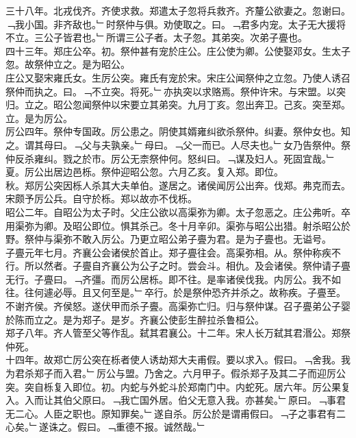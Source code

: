 \documentclass{zhvt-classic}
\begin{document}
\hspace*{2em}三十八年。北戎伐齐。齐使求救。郑遣太子忽将兵救齐。齐釐公欲妻之。忽谢曰。﹁我小国。非齐敌也。﹂时祭仲与俱。劝使取之。曰。﹁君多内宠。太子无大援将不立。三公子皆君也。﹂所谓三公子者。太子忽。其弟突。次弟子亹也。\\
\hspace*{2em}四十三年。郑庄公卒。初。祭仲甚有宠於庄公。庄公使为卿。公使娶邓女。生太子忽。故祭仲立之。是为昭公。\\
\hspace*{2em}庄公又娶宋雍氏女。生厉公突。雍氏有宠於宋。宋庄公闻祭仲之立忽。乃使人诱召祭仲而执之。曰。﹁不立突。将死。﹂亦执突以求赂焉。祭仲许宋。与宋盟。以突归。立之。昭公忽闻祭仲以宋要立其弟突。九月丁亥。忽出奔卫。己亥。突至郑。立。是为厉公。\\
\hspace*{2em}厉公四年。祭仲专国政。厉公患之。阴使其婿雍纠欲杀祭仲。纠妻。祭仲女也。知之。谓其母曰。﹁父与夫孰亲。﹂母曰。﹁父一而已。人尽夫也。﹂女乃告祭仲。祭仲反杀雍纠。戮之於市。厉公无柰祭仲何。怒纠曰。﹁谋及妇人。死固宜哉。﹂夏。厉公出居边邑栎。祭仲迎昭公忽。六月乙亥。复入郑。即位。\\
\hspace*{2em}秋。郑厉公突因栎人杀其大夫单伯。遂居之。诸侯闻厉公出奔。伐郑。弗克而去。宋颇予厉公兵。自守於栎。郑以故亦不伐栎。\\
\hspace*{2em}昭公二年。自昭公为太子时。父庄公欲以高渠弥为卿。太子忽恶之。庄公弗听。卒用渠弥为卿。及昭公即位。惧其杀己。冬十月辛卯。渠弥与昭公出猎。射杀昭公於野。祭仲与渠弥不敢入厉公。乃更立昭公弟子亹为君。是为子亹也。无谥号。\\
\hspace*{2em}子亹元年七月。齐襄公会诸侯於首止。郑子亹往会。高渠弥相。从。祭仲称疾不行。所以然者。子亹自齐襄公为公子之时。尝会斗。相仇。及会诸侯。祭仲请子亹无行。子亹曰。﹁齐彊。而厉公居栎。即不往。是率诸侯伐我。内厉公。我不如往。往何遽必辱。且又何至是。﹂卒行。於是祭仲恐齐并杀之。故称疾。子亹至。不谢齐侯。齐侯怒。遂伏甲而杀子亹。高渠弥亡归。归与祭仲谋。召子亹弟公子婴於陈而立之。是为郑子。是岁。齐襄公使彭生醉拉杀鲁桓公。\\
\hspace*{2em}郑子八年。齐人管至父等作乱。弑其君襄公。十二年。宋人长万弑其君湣公。郑祭仲死。\\
\hspace*{2em}十四年。故郑亡厉公突在栎者使人诱劫郑大夫甫假。要以求入。假曰。﹁舍我。我为君杀郑子而入君。﹂厉公与盟。乃舍之。六月甲子。假杀郑子及其二子而迎厉公突。突自栎复入即位。初。内蛇与外蛇斗於郑南门中。内蛇死。居六年。厉公果复入。入而让其伯父原曰。﹁我亡国外居。伯父无意入我。亦甚矣。﹂原曰。﹁事君无二心。人臣之职也。原知罪矣。﹂遂自杀。厉公於是谓甫假曰。﹁子之事君有二心矣。﹂遂诛之。假曰。﹁重德不报。诚然哉。﹂\\
\end{document}
